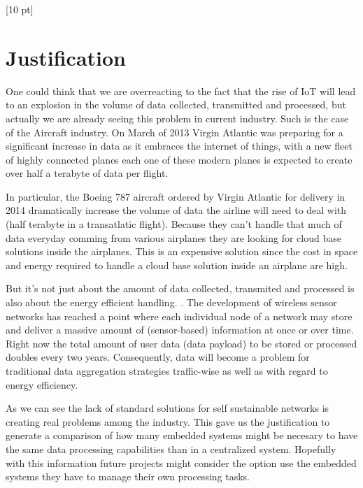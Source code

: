 \titleformat{\chapter}{\Huge\bfseries}{\thechapter}{0 pt}{\rule{340 pt}{3 pt}\\}
\titlespacing{\chapter}{100 pt}{-25 pt}{40 pt}[10 pt]	
\pagestyle{fancy}
\fancyhead[RO,RE]{\thepage}
\fancyfoot[CO,CE]{}

\chapter*{Justification}

\normalsize
\noindent

One could think that we are overreacting to the fact that the rise of IoT will
lead to an explosion in the volume of data collected, transmitted and
processed, but actually we are already seeing this problem in current industry.
Such is the case of the Aircraft industry. On March of 2013 Virgin Atlantic was
preparing for a significant increase in data as it embraces the internet of
things, with a new fleet of highly connected planes each one of these modern
planes is expected to create over half a terabyte of data per flight.

In particular, the Boeing 787 aircraft ordered by Virgin Atlantic for delivery
in 2014  dramatically increase the volume of data the airline will need to deal
with (half terabyte in a transatlatic flight).  Because they can't handle that
much of data everyday comming from various airplanes they are looking
for cloud base solutions inside the airplanes. This is an expensive solution
since the cost in space and energy required to handle a cloud base solution
inside an airplane are high.

But it's not just about the amount of data collected, transmited and processed is
also about the energy efficient handling. \cite{Bergelt}. The development of
wireless sensor networks has reached a point where each individual node of a
network may store and deliver a massive amount of (sensor-based) information at
once or over time.  Right now the total amount of user data (data payload) to
be stored or processed doubles every two years. Consequently, data will become
a problem for traditional data aggregation strategies traffic-wise as well as
with regard to energy efficiency. 

As we can see the lack of standard solutions for self sustainable networks is
creating real problems among the industry. This gave us the justification to
generate a comparison of how many embedded systems might be necesary to have
the same data processing capabilities than in a centralized system. Hopefully
with this information future projects might consider the option use the
embedded systems they have to manage their own processing tasks.

\clearpage
